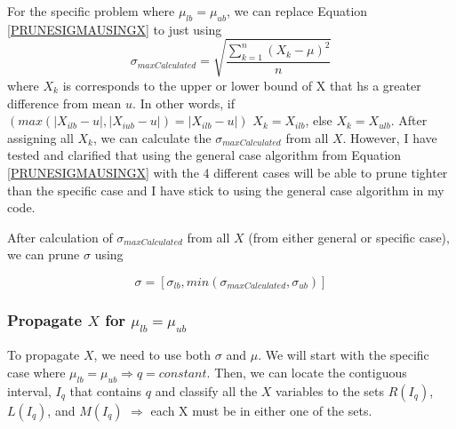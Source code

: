 \documentclass[a4paper,12pt]{article}
\begin{document}
For the specific problem where 
$\mu_{lb} = \mu_{ub}$, we can replace Equation \ref{PRUNESIGMAUSINGX} to just using
\begin{equation}
\label{PRUNESIGMAUSINGXSPECIFICCASE}
 \sigma_{maxCalculated} = \sqrt{\frac{\sum_{k=1}^n(X_{k} - \mu)^2} {n}}
\end{equation} 
where $X_{k}$ is corresponds to the upper or lower bound of X that hs a greater difference from mean $u$. In other words,
if $(max(|X_{ilb} - u|, |X_{iub} - u|) = |X_{ilb} - u|) $
$X_{k} = X_{ilb}$, else $X_{k} = X_{ulb}$. After assigning all $X_{k}$, we can calculate the $\sigma_{maxCalculated}$ from all $X$. However, I have tested and clarified that using the general case algorithm from Equation \ref{PRUNESIGMAUSINGX} with the 4 different cases will be able to prune tighter than 
the specific case and I have stick to using the general case algorithm in my code.

After calculation of $\sigma_{maxCalculated}$ from all $X$ (from either general or specific case), we can prune $\sigma$ using 

\begin{equation}
\label{PRUNESIGMAUSEX}
\sigma = [\sigma_{lb}, min(\sigma_{maxCalculated} , \sigma_{ub})]
\end{equation} 

\subsubsection{Propagate $X$ for $\mu_{lb}=\mu_{ub}$}
To propagate $X$, we need to use both $\sigma$ and $\mu$. We will start with the specific case where $\mu_{lb} = \mu_{ub} \Rightarrow q=constant$. 
 Then, we can locate the contiguous interval, $I_{q}$ that contains $q$ and classify all the $X$ variables to the sets $R(I_{q})$, $L(I_{q})$, and $M(I_{q})$ $\Rightarrow$ each X must be in either one of the sets. 
\end{document}

